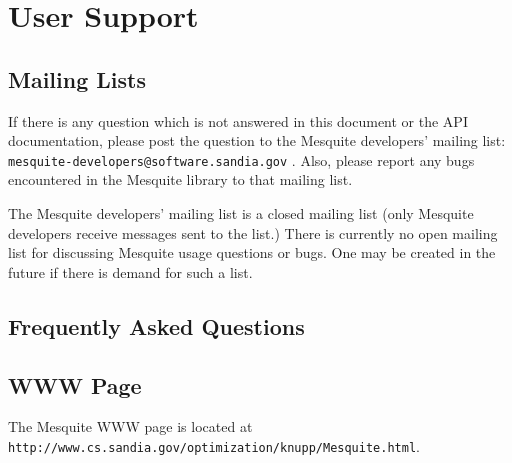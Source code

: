 \chapter{User Support}

\section{Mailing Lists}

If there is any question which is not answered in this document or the API
documentation, please post the question to the Mesquite developers' 
mailing list:  {\tt mesquite-developers@software.sandia.gov} .  Also,
please report any bugs encountered in the Mesquite library to that mailing
list.

The Mesquite developers' mailing list is a closed mailing list (only
Mesquite developers receive messages sent to the list.)  There is 
currently no open mailing list for discussing Mesquite usage questions
or bugs.  One may be created in the future if there is demand for such
a list.  

\section{Frequently Asked Questions}

\section{WWW Page}

The Mesquite WWW page is located at 
{\tt http://www.cs.sandia.gov/optimization/knupp/Mesquite.html}.

